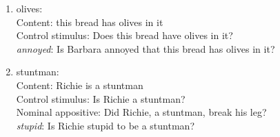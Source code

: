 \documentclass[11pt,fleqn]{article}
\newcommand{\6}{\mbox{$[\hspace*{-.6mm}[$}}
\newcommand{\9}{\mbox{$]\hspace*{-.6mm}]$}}
\begin{document}
\begin{enumerate}
\item olives:  \\
   	Content: this bread has olives in it\\
   	Control stimulus: Does this bread have olives in it?\\
   	{\em annoyed}: Is Barbara annoyed that this bread has olives in it?

\item stuntman:  \\
   	Content: Richie is a stuntman\\
   	Control stimulus: Is Richie a stuntman?\\
   	Nominal appositive: Did Richie, a stuntman, break his leg?\\
   	{\em stupid}: Is Richie stupid to be a stuntman?

\end{enumerate}



\end{document}
